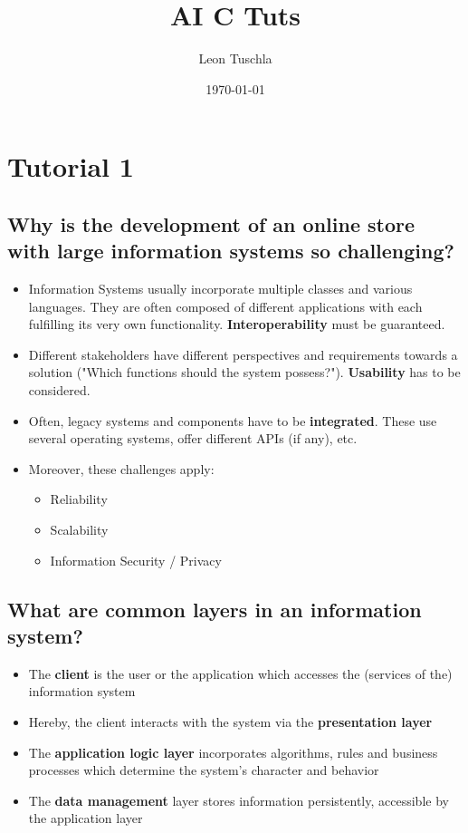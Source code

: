 \documentclass{article}
\title{AI C Tuts}
\author{Leon Tuschla}
\date{\today}
\begin{document}
\maketitle
\section{Tutorial 1}
\subsection{Why is the development of an online store with large information systems so challenging?}
\begin{itemize}
    \item Information Systems usually incorporate multiple classes and various languages. They are often composed of different applications with each fulfilling its very own functionality. \textbf{Interoperability} must be guaranteed.
    \item Different stakeholders have different perspectives and requirements towards a solution ("Which functions should the system possess?"). \textbf{Usability} has to be considered.
    \item Often, legacy systems and components have to be \textbf{integrated}. These use several operating systems, offer different APIs (if any), etc.
    \item Moreover, these challenges apply:
          \begin{itemize}
              \item Reliability
              \item Scalability
              \item Information Security / Privacy
          \end{itemize}
\end{itemize}

\subsection{What are common layers in an information system?}
\begin{itemize}
    \item The \textbf{client} is the user or the application which accesses the (services of the) information system
    \item Hereby, the client interacts with the system via the \textbf{presentation layer}
    \item The \textbf{application logic layer} incorporates algorithms, rules and business processes which determine the system's character and behavior
    \item The \textbf{data management} layer stores information persistently, accessible by the application layer
\end{itemize}
\end{document}
